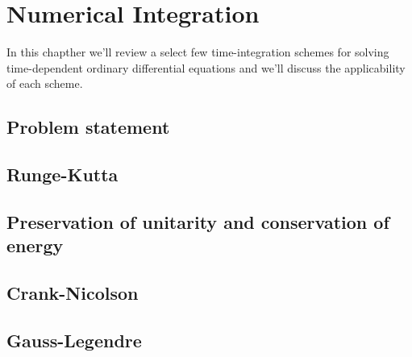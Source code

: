\chapter{Numerical Integration}
    In this chapther we'll review a select few time-integration schemes for
    solving time-dependent ordinary differential equations and we'll discuss the
    applicability of each scheme.

    \section{Problem statement}
    \section{Runge-Kutta}
    \section{Preservation of unitarity and conservation of energy}
    \section{Crank-Nicolson}
    \section{Gauss-Legendre}
